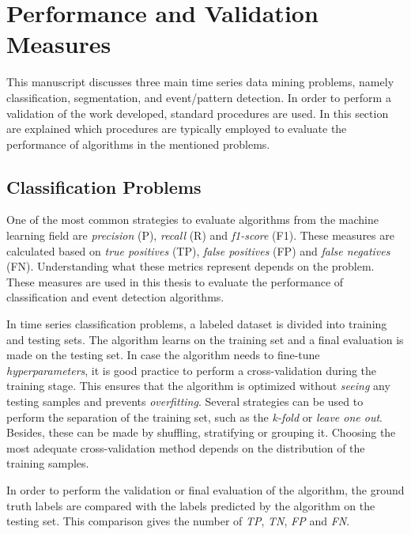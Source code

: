 %


\section{Performance and Validation Measures}

This manuscript discusses three main time series data mining problems, namely classification, segmentation, and event/pattern detection. In order to perform a validation of the work developed, standard procedures are used. In this section are explained which procedures are typically employed to evaluate the performance of algorithms in the mentioned problems.

\subsection{Classification Problems}

One of the most common strategies to evaluate algorithms from the machine learning field are \textit{precision} (P), \textit{recall} (R) and \textit{f1-score} (F1). These measures are calculated based on \textit{true positives} (TP), \textit{false positives} (FP) and \textit{false negatives} (FN). Understanding what these metrics represent depends on the problem. These measures are used in this thesis to evaluate the performance of classification and event detection algorithms.

In time series classification problems, a labeled dataset is divided into training and testing sets. The algorithm learns on the training set and a final evaluation is made on the testing set. In case the algorithm needs to fine-tune \textit{hyperparameters}, it is good practice to perform a cross-validation during the training stage. This ensures that the algorithm is optimized without \textit{seeing} any testing samples and prevents \textit{overfitting}. Several strategies can be used to perform the separation of the training set, such as the \textit{k-fold} or \textit{leave one out}. Besides, these can be made by shuffling, stratifying or grouping it. Choosing the most adequate cross-validation method depends on the distribution of the training samples.

In order to perform the validation or final evaluation of the algorithm, the ground truth labels are compared with the labels predicted by the algorithm on the testing set. This comparison gives the number of \textit{TP}, \textit{TN}, \textit{FP} and \textit{FN}.

